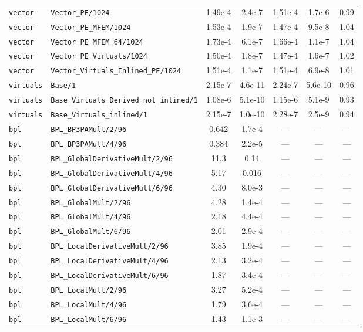 \begin{tabular}{ll S[table-format=3.4e-1] S[table-format=1.2e-1] S[table-format=3.4e-1] S[table-format=1.2e-1] S[table-format=2.2]}
\texttt{vector} & \texttt{Vector\_PE/1024} & 1.49e-4 & 2.4e-7 & 1.51e-4 & 1.7e-6 & 0.99 \\
\texttt{vector} & \texttt{Vector\_PE\_MFEM/1024} & 1.53e-4 & 1.9e-7 & 1.47e-4 & 9.5e-8 & 1.04 \\
\texttt{vector} & \texttt{Vector\_PE\_MFEM\_64/1024} & 1.73e-4 & 6.1e-7 & 1.66e-4 & 1.1e-7 & 1.04 \\
\texttt{vector} & \texttt{Vector\_PE\_Virtuals/1024} & 1.50e-4 & 1.8e-7 & 1.47e-4 & 1.6e-7 & 1.02 \\
\texttt{vector} & \texttt{Vector\_Virtuals\_Inlined\_PE/1024} & 1.51e-4 & 1.1e-7 & 1.51e-4 & 6.9e-8 & 1.01 \\
\texttt{virtuals} & \texttt{Base/1} & 2.15e-7 & 4.6e-11 & 2.24e-7 & 5.6e-10 & 0.96 \\
\texttt{virtuals} & \texttt{Base\_Virtuals\_Derived\_not\_inlined/1} & 1.08e-6 & 5.1e-10 & 1.15e-6 & 5.1e-9 & 0.93 \\
\texttt{virtuals} & \texttt{Base\_Virtuals\_inlined/1} & 2.15e-7 & 1.0e-10 & 2.28e-7 & 2.5e-9 & 0.94 \\
\texttt{bpl} & \texttt{BPL\_BP3PAMult/2/96} & 0.642 & 1.7e-4 & {---} & {---} & {---} \\
\texttt{bpl} & \texttt{BPL\_BP3PAMult/4/96} & 0.384 & 2.2e-5 & {---} & {---} & {---} \\
\texttt{bpl} & \texttt{BPL\_GlobalDerivativeMult/2/96} & 11.3 & 0.14 & {---} & {---} & {---} \\
\texttt{bpl} & \texttt{BPL\_GlobalDerivativeMult/4/96} & 5.17 & 0.016 & {---} & {---} & {---} \\
\texttt{bpl} & \texttt{BPL\_GlobalDerivativeMult/6/96} & 4.30 & 8.0e-3 & {---} & {---} & {---} \\
\texttt{bpl} & \texttt{BPL\_GlobalMult/2/96} & 4.28 & 1.4e-4 & {---} & {---} & {---} \\
\texttt{bpl} & \texttt{BPL\_GlobalMult/4/96} & 2.18 & 4.4e-4 & {---} & {---} & {---} \\
\texttt{bpl} & \texttt{BPL\_GlobalMult/6/96} & 2.01 & 2.9e-4 & {---} & {---} & {---} \\
\texttt{bpl} & \texttt{BPL\_LocalDerivativeMult/2/96} & 3.85 & 1.9e-4 & {---} & {---} & {---} \\
\texttt{bpl} & \texttt{BPL\_LocalDerivativeMult/4/96} & 2.13 & 3.2e-4 & {---} & {---} & {---} \\
\texttt{bpl} & \texttt{BPL\_LocalDerivativeMult/6/96} & 1.87 & 3.4e-4 & {---} & {---} & {---} \\
\texttt{bpl} & \texttt{BPL\_LocalMult/2/96} & 3.27 & 5.2e-4 & {---} & {---} & {---} \\
\texttt{bpl} & \texttt{BPL\_LocalMult/4/96} & 1.79 & 3.6e-4 & {---} & {---} & {---} \\
\texttt{bpl} & \texttt{BPL\_LocalMult/6/96} & 1.43 & 1.1e-3 & {---} & {---} & {---} \\
\bottomrule
\end{tabular}

